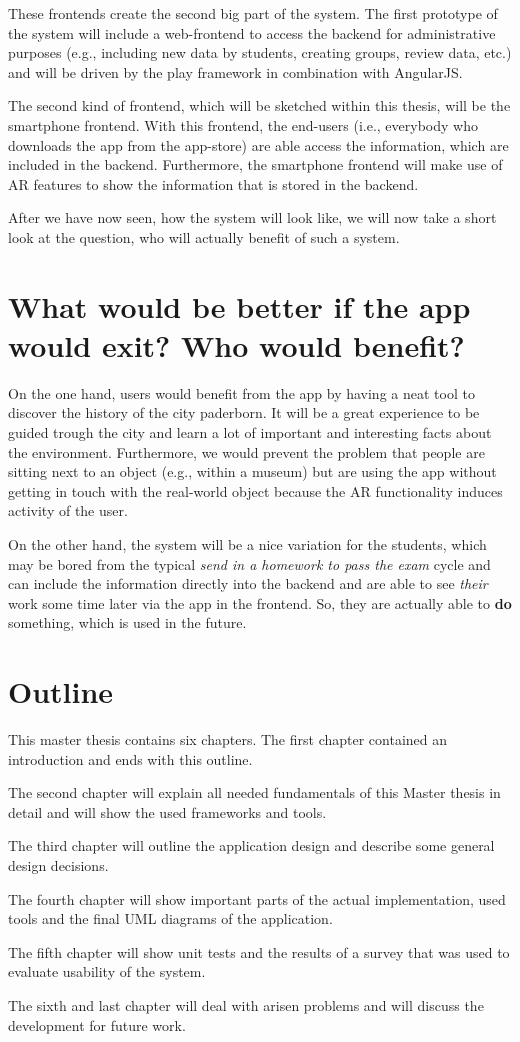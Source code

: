 These frontends create the second big part of the system. The first prototype of the system will include a web-frontend to access the backend for administrative purposes (e.g., including new data by students, creating groups, review data, etc.) and will be driven by the play framework in combination with AngularJS. 

The second kind of frontend, which will be sketched within this thesis, will be the smartphone frontend. With this frontend, the end-users (i.e., everybody who downloads the app from the app-store) are able access the information, which are included in the backend. Furthermore, the smartphone frontend will make use of \ac{AR} features to show the information that is stored in the backend. 

After we have now seen, how the system will look like, we will now take a short look at the question, who will actually benefit of such a system.   

\section{What would be better if the app would exit? Who would benefit?}
On the one hand, users would benefit from the app by having a neat tool to discover the history of the city paderborn. It will be a great experience to be guided trough the city and learn a lot of important and interesting facts about the environment. Furthermore, we would prevent the problem that people are sitting next to an object (e.g., within a museum) but are using the app without getting in touch with the real-world object because the \ac{AR} functionality induces activity of the user.  

On the other hand, the system will be a nice variation for the students, which may be bored from the typical \textit{send in a homework to pass the exam} cycle and can include the information directly into the backend and are able to see \textit{their} work some time later via the app in the frontend. So, they are actually able to \textbf{do} something, which is used in the future.    

\section{Outline}
This master thesis contains six chapters. The first chapter contained an introduction and ends with this outline.

The second chapter will explain all needed fundamentals of this Master thesis in detail and will show the used frameworks and tools.

The third chapter will outline the application design and describe some general design decisions.

The fourth chapter will show important parts of the actual implementation, used tools and the final \acf{UML} diagrams of the application.

The fifth chapter will show unit tests and the results of a survey that was used to evaluate usability of the system. 

The sixth and last chapter will deal with arisen problems and will discuss the development for future work.
